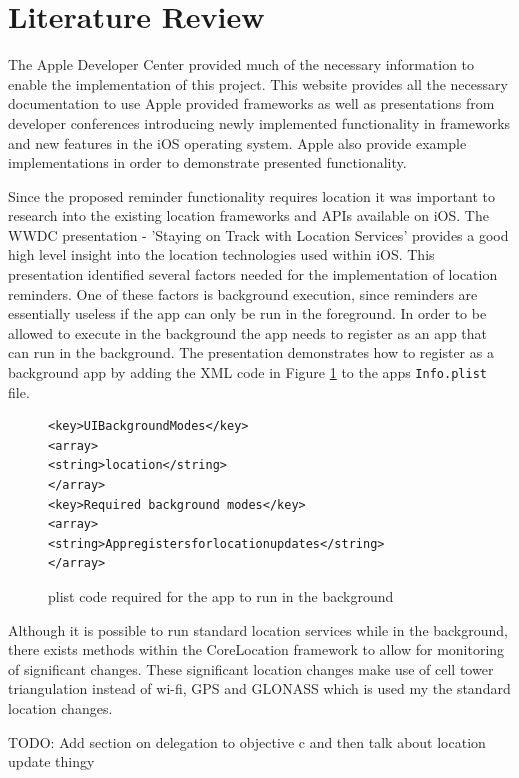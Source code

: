 \documentclass[12pt]{report}
\begin{document}
\section{Literature Review}

The Apple Developer Center \cite{devcenter} provided much of the necessary information to enable the implementation of this project. This website provides all the necessary documentation to use Apple provided frameworks as well as presentations from developer conferences introducing newly implemented functionality in frameworks and new features in the iOS operating system. Apple also provide example implementations in order to demonstrate presented functionality.

Since the proposed reminder functionality requires location it was important to research into the existing location frameworks and APIs available on iOS. The WWDC presentation - 'Staying on Track with Location Services' \cite{locationservices} provides a good high level insight into the location technologies used within iOS. This presentation identified several factors needed for the implementation of location reminders. One of these factors is background execution, since reminders are essentially useless if the app can only be run in the foreground. In order to be allowed to execute in the background the app needs to register as an app that can run in the background. The presentation demonstrates how to register as a background app by adding the XML code in Figure \ref{fig:plist} to the apps \texttt{Info.plist} file.

\begin{figure}[h!]
\begin{verbatim}
<key>UIBackgroundModes</key>
<array>
<string>location</string>
</array>
<key>Required background modes</key>
<array>
<string>Appregistersforlocationupdates</string>
</array>
\end{verbatim}
\label{fig:plist}
\caption{plist code required for the app to run in the background}
\end{figure}

Although it is possible to run standard location services while in the background, there exists methods within the CoreLocation framework to allow for monitoring of significant changes. These significant location changes make use of cell tower triangulation instead of wi-fi, GPS and GLONASS which is used my the standard location changes.

TODO: Add section on delegation to objective c and then talk about location update thingy
\end{document}
